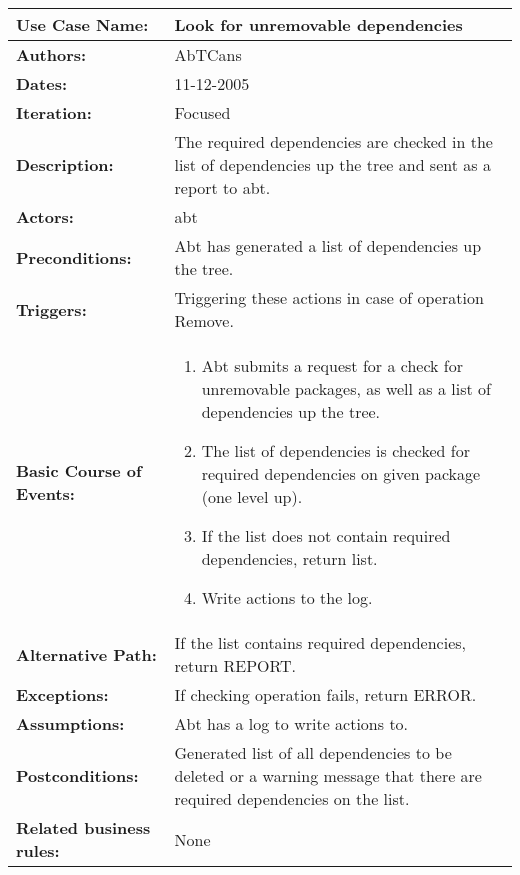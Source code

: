 \begin{tabularx}{\linewidth}{|l|X|}
\hline
\textbf{Use Case Name:} & \textbf{Look for unremovable dependencies} \\
\hline
\textbf{Authors:} & AbTCans\\
\hline
\textbf{Dates:} & 11-12-2005\\
\hline
\textbf{Iteration:} & Focused\\
\hline
\textbf{Description:} & The required dependencies are checked in the list of dependencies up the tree and sent as a report to abt. \\
\hline
\textbf{Actors:} & abt \\ 
\hline
\textbf{Preconditions:} & Abt has generated a list of dependencies up the tree.\\
\hline
\textbf{Triggers:} & Triggering these actions in case of operation Remove.\\
\hline
\textbf{Basic Course of Events:} & 
\begin{minipage}{\linewidth} 
  \vspace{0.05em}
  \begin{enumerate}
   \item Abt submits a request for a check for unremovable packages, as well as a list of dependencies up the tree.
   \item The list of dependencies is checked for required dependencies on given package (one level up).
   \item If the list does not contain required dependencies, return list. 
   \item Write actions to the log.
  \end{enumerate}
  \vspace{0.05em}
\end{minipage}
\\
\hline 
\textbf{Alternative Path:} & If the list contains required dependencies, return REPORT.\\
\hline
\textbf{Exceptions:} & If checking operation fails, return ERROR. \\
\hline
\textbf{Assumptions:} & Abt has a log to write actions to.\\
\hline
\textbf{Postconditions:} & Generated list of all dependencies to be deleted or a warning message that there are required dependencies on the list.\\
\hline
\textbf{Related business rules:} & None\\
\hline
\end{tabularx}


     